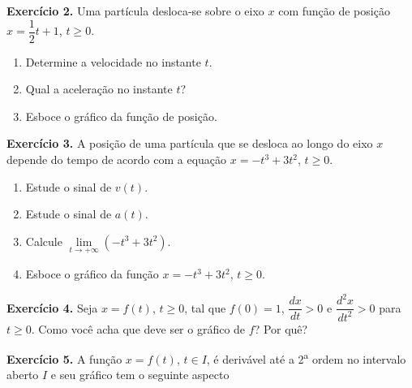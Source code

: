 \documentclass[12pt,a4paper]{article}
\begin{document}
\vspace{0.5cm}
\noindent\textbf{Exercício 2.} Uma partícula desloca-se sobre o eixo $x$ com função de posição $x = \dfrac{1}{2}t + 1$, $t \ge 0$.
\begin{enumerate}
    \renewcommand{\theenumi}{\alph{enumi}}
    \renewcommand{\labelenumi}{\theenumi)}
    \item Determine a velocidade no instante $t$.
    \item Qual a aceleração no instante $t$?
    \item Esboce o gráfico da função de posição.
\end{enumerate}

\vspace{0.5cm}
\noindent\textbf{Exercício 3.} A posição de uma partícula que se desloca ao longo do eixo $x$ depende do tempo de acordo com a equação $x = -t^3 + 3t^2$, $t \ge 0$.
\begin{enumerate}
    \renewcommand{\theenumi}{\alph{enumi}}
    \renewcommand{\labelenumi}{\theenumi)}
    \item Estude o sinal de $v(t)$.
    \item Estude o sinal de $a(t)$.
    \item Calcule $\lim\limits_{t \to +\infty} (-t^3 + 3t^2)$.
    \item Esboce o gráfico da função $x = -t^3 + 3t^2$, $t \ge 0$.
\end{enumerate}

\vspace{0.5cm}
\noindent\textbf{Exercício 4.}
Seja $x = f(t)$, $t \ge 0$, tal que $f(0) = 1$, $\dfrac{dx}{dt} > 0$ e $\dfrac{d^2 x}{dt^2} > 0$ para $t \ge 0$. Como você acha que deve ser o gráfico de $f$? Por quê?

\vspace{0.5cm}
\noindent\textbf{Exercício 5.}
A função $x = f(t)$, $t \in I$, é derivável até a 2\textsuperscript{a} ordem no intervalo aberto $I$ e seu gráfico tem o seguinte aspecto

\begin{center}
\end{center}
\end{document}

